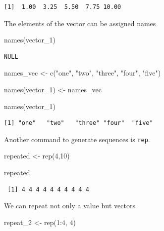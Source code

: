 \documentclass[
  letterpaper,
  DIV=11,
  numbers=noendperiod]{scrartcl}
\newenvironment{Shaded}{\begin{snugshade}}{\end{snugshade}}
\newcommand{\DecValTok}[1]{\textcolor[rgb]{0.68,0.00,0.00}{#1}}
\newcommand{\FunctionTok}[1]{\textcolor[rgb]{0.28,0.35,0.67}{#1}}
\newcommand{\NormalTok}[1]{\textcolor[rgb]{0.00,0.23,0.31}{#1}}
\newcommand{\OtherTok}[1]{\textcolor[rgb]{0.00,0.23,0.31}{#1}}
\newcommand{\SpecialCharTok}[1]{\textcolor[rgb]{0.37,0.37,0.37}{#1}}
\newcommand{\StringTok}[1]{\textcolor[rgb]{0.13,0.47,0.30}{#1}}
\begin{document}
\begin{tcolorbox}
\begin{verbatim}
[1]  1.00  3.25  5.50  7.75 10.00
\end{verbatim}

The elements of the vector can be assigned names

\begin{Shaded}
\begin{Highlighting}[]
\FunctionTok{names}\NormalTok{(vector\_1)}
\end{Highlighting}
\end{Shaded}

\begin{verbatim}
NULL
\end{verbatim}

\begin{Shaded}
\begin{Highlighting}[]
\NormalTok{names\_vec }\OtherTok{\textless{}{-}} \FunctionTok{c}\NormalTok{(}\StringTok{"one"}\NormalTok{, }\StringTok{"two"}\NormalTok{, }\StringTok{"three"}\NormalTok{, }\StringTok{"four"}\NormalTok{, }\StringTok{"five"}\NormalTok{)}

\FunctionTok{names}\NormalTok{(vector\_1) }\OtherTok{\textless{}{-}}\NormalTok{ names\_vec}

\FunctionTok{names}\NormalTok{(vector\_1)}
\end{Highlighting}
\end{Shaded}

\begin{verbatim}
[1] "one"   "two"   "three" "four"  "five" 
\end{verbatim}

Another command to generate sequences is \texttt{rep}.

\begin{Shaded}
\begin{Highlighting}[]
\NormalTok{repeated }\OtherTok{\textless{}{-}} \FunctionTok{rep}\NormalTok{(}\DecValTok{4}\NormalTok{,}\DecValTok{10}\NormalTok{)}

\NormalTok{repeated}
\end{Highlighting}
\end{Shaded}

\begin{verbatim}
 [1] 4 4 4 4 4 4 4 4 4 4
\end{verbatim}

We can repeat not only a value but vectors

\begin{Shaded}
\begin{Highlighting}[]
\NormalTok{repeat\_2 }\OtherTok{\textless{}{-}} \FunctionTok{rep}\NormalTok{(}\DecValTok{1}\SpecialCharTok{:}\DecValTok{4}\NormalTok{, }\DecValTok{4}\NormalTok{)}


\end{Highlighting}
\end{Shaded}
\end{tcolorbox}
\end{document}
